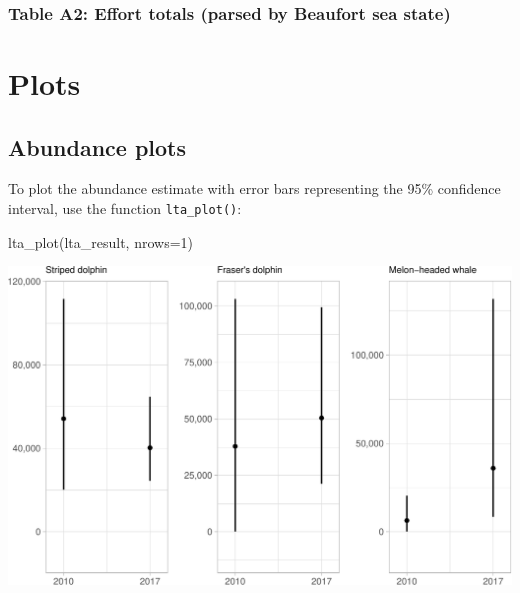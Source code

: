 \documentclass[
]{book}
\newenvironment{Shaded}{\begin{snugshade}}{\end{snugshade}}
\newcommand{\AttributeTok}[1]{\textcolor[rgb]{0.77,0.63,0.00}{#1}}
\newcommand{\ControlFlowTok}[1]{\textcolor[rgb]{0.13,0.29,0.53}{\textbf{#1}}}
\newcommand{\DecValTok}[1]{\textcolor[rgb]{0.00,0.00,0.81}{#1}}
\newcommand{\FunctionTok}[1]{\textcolor[rgb]{0.00,0.00,0.00}{#1}}
\newcommand{\NormalTok}[1]{#1}
\newcommand{\SpecialCharTok}[1]{\textcolor[rgb]{0.00,0.00,0.00}{#1}}
\newcommand{\StringTok}[1]{\textcolor[rgb]{0.31,0.60,0.02}{#1}}
\begin{document}
\hypertarget{table-a2-effort-totals-parsed-by-beaufort-sea-state}{%
\subsection*{Table A2: Effort totals (parsed by Beaufort sea state)}\label{table-a2-effort-totals-parsed-by-beaufort-sea-state}}

\begin{Shaded}
\end{Shaded}

\hypertarget{plots}{%
\chapter{Plots}\label{plots}}

\hypertarget{abundance-plots}{%
\section*{Abundance plots}\label{abundance-plots}}

To plot the abundance estimate with error bars representing the 95\% confidence interval, use the function \texttt{lta\_plot()}:

\begin{Shaded}
\begin{Highlighting}[]
\FunctionTok{lta\_plot}\NormalTok{(lta\_result, }
         \AttributeTok{nrows=}\DecValTok{1}\NormalTok{)}
\end{Highlighting}
\end{Shaded}

\includegraphics{figures/unnamed-chunk-323-1.pdf}
\end{document}
